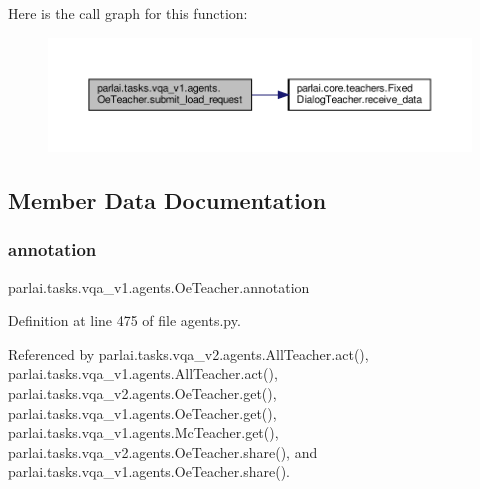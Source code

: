 Here is the call graph for this function\+:
\nopagebreak
\begin{figure}[H]
\begin{center}
\leavevmode
\includegraphics[width=350pt]{classparlai_1_1tasks_1_1vqa__v1_1_1agents_1_1OeTeacher_aed7f88bcef1e901e87d0a947d180586f_cgraph}
\end{center}
\end{figure}


\subsection{Member Data Documentation}
\mbox{\label{classparlai_1_1tasks_1_1vqa__v1_1_1agents_1_1OeTeacher_ae7832c20e91858e3bbea62e333d585e5}} 
\subsubsection{\texorpdfstring{annotation}{annotation}}
{\footnotesize\ttfamily parlai.\+tasks.\+vqa\+\_\+v1.\+agents.\+Oe\+Teacher.\+annotation}



Definition at line 475 of file agents.\+py.



Referenced by parlai.\+tasks.\+vqa\+\_\+v2.\+agents.\+All\+Teacher.\+act(), parlai.\+tasks.\+vqa\+\_\+v1.\+agents.\+All\+Teacher.\+act(), parlai.\+tasks.\+vqa\+\_\+v2.\+agents.\+Oe\+Teacher.\+get(), parlai.\+tasks.\+vqa\+\_\+v1.\+agents.\+Oe\+Teacher.\+get(), parlai.\+tasks.\+vqa\+\_\+v1.\+agents.\+Mc\+Teacher.\+get(), parlai.\+tasks.\+vqa\+\_\+v2.\+agents.\+Oe\+Teacher.\+share(), and parlai.\+tasks.\+vqa\+\_\+v1.\+agents.\+Oe\+Teacher.\+share().

\mbox{\label{classparlai_1_1tasks_1_1vqa__v1_1_1agents_1_1OeTeacher_a12671717135e971a2ec374079432b670}} 
